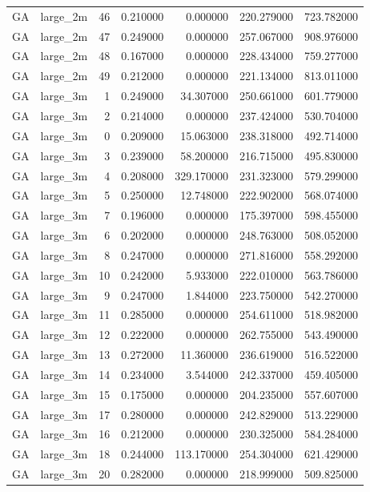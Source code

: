 \begin{tabular}{llrrrrr}
GA & large_2m & 46 & 0.210000 & 0.000000 & 220.279000 & 723.782000 \\
GA & large_2m & 47 & 0.249000 & 0.000000 & 257.067000 & 908.976000 \\
GA & large_2m & 48 & 0.167000 & 0.000000 & 228.434000 & 759.277000 \\
GA & large_2m & 49 & 0.212000 & 0.000000 & 221.134000 & 813.011000 \\
GA & large_3m & 1 & 0.249000 & 34.307000 & 250.661000 & 601.779000 \\
GA & large_3m & 2 & 0.214000 & 0.000000 & 237.424000 & 530.704000 \\
GA & large_3m & 0 & 0.209000 & 15.063000 & 238.318000 & 492.714000 \\
GA & large_3m & 3 & 0.239000 & 58.200000 & 216.715000 & 495.830000 \\
GA & large_3m & 4 & 0.208000 & 329.170000 & 231.323000 & 579.299000 \\
GA & large_3m & 5 & 0.250000 & 12.748000 & 222.902000 & 568.074000 \\
GA & large_3m & 7 & 0.196000 & 0.000000 & 175.397000 & 598.455000 \\
GA & large_3m & 6 & 0.202000 & 0.000000 & 248.763000 & 508.052000 \\
GA & large_3m & 8 & 0.247000 & 0.000000 & 271.816000 & 558.292000 \\
GA & large_3m & 10 & 0.242000 & 5.933000 & 222.010000 & 563.786000 \\
GA & large_3m & 9 & 0.247000 & 1.844000 & 223.750000 & 542.270000 \\
GA & large_3m & 11 & 0.285000 & 0.000000 & 254.611000 & 518.982000 \\
GA & large_3m & 12 & 0.222000 & 0.000000 & 262.755000 & 543.490000 \\
GA & large_3m & 13 & 0.272000 & 11.360000 & 236.619000 & 516.522000 \\
GA & large_3m & 14 & 0.234000 & 3.544000 & 242.337000 & 459.405000 \\
GA & large_3m & 15 & 0.175000 & 0.000000 & 204.235000 & 557.607000 \\
GA & large_3m & 17 & 0.280000 & 0.000000 & 242.829000 & 513.229000 \\
GA & large_3m & 16 & 0.212000 & 0.000000 & 230.325000 & 584.284000 \\
GA & large_3m & 18 & 0.244000 & 113.170000 & 254.304000 & 621.429000 \\
GA & large_3m & 20 & 0.282000 & 0.000000 & 218.999000 & 509.825000 \\

\end{tabular}
